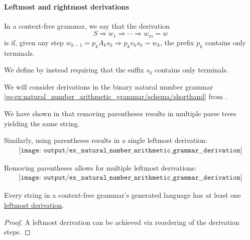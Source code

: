 \paragraph{Leftmost and rightmost derivations}

\begin{definition}\label{def:leftmost_derivation}
  In a context-free grammar, we say that the derivation
  \begin{equation*}
    S \Rightarrow w_1 \Rightarrow \cdots \Rightarrow w_m = w
  \end{equation*}
  is  if, given any step \( w_{k-1} = p_k A_k s_k \Rightarrow p_k v_k s_k = w_k \), the prefix \( p_k \) contains only terminals.

  We define  by instead requiring that the suffix \( s_k \) contains only terminals.
\end{definition}

\begin{example}\label{ex:natural_number_arithmetic_grammar/derivation}
  We will consider derivations in the binary natural number grammar \eqref{eq:ex:natural_number_arithmetic_grammar/schema/shorthand} from .

  We have shown in  that removing parentheses results in multiple parse trees yielding the same string.

  Similarly, using parentheses results in a single leftmost derivation:
  \begin{equation*}
    \begin{aligned}
      \texttt{[image: output/ex\_\_natural\_number\_arithmetic\_grammar\_\_derivation]}
    \end{aligned}
  \end{equation*}

  Removing parentheses allows for multiple leftmost derivations:
  \begin{equation*}
    \begin{aligned}
      \texttt{[image: output/ex\_\_natural\_number\_arithmetic\_grammar\_\_derivation]}
    \end{aligned}
  \end{equation*}
\end{example}

\begin{proposition}\label{thm:leftmost_derivation_existence}
  Every string in a context-free grammar's generated language has at least one \hyperref[def:leftmost_derivation]{leftmost derivation}.
\end{proposition}
\begin{proof}
  A leftmost derivation can be achieved via reordering of the derivation steps.
\end{proof}

